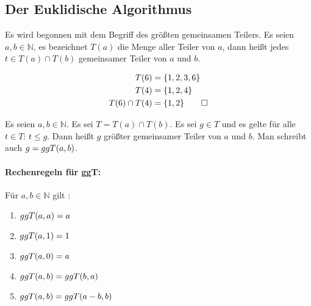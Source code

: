 \subsection{Der Euklidische Algorithmus}
Es wird begonnen mit dem Begriff des größten gemeinsamen Teilers.
Es seien $a,b \in  \mathbb{N}$, es bezeichnet $T(a)$ die Menge aller Teiler von $a$,
dann heißt jedes $t \in T(a) \cap T(b)$ gemeinsamer Teiler von $a$ und $b$.

\begin{example}
  \begin{align*}
    T(6)           & = \{1,2,3,6\}      \\
    T(4)           & = \{1,2,4\}        \\
    T(6) \cap T(4) & = \{1,2\} \qedhere
  \end{align*}
\end{example}

\begin{definition}
  Es seien $a,b \in \mathbb{N}$. Es sei $T = T(a) \cap T(b)$.
  Es sei $g \in T$ und es gelte für alle $t \in T$: $t \leq g$. Dann heißt $g$
  größter gemeinsamer Teiler von $a$ und $b$.
  Man schreibt auch $g = ggT(a,b)$.
\end{definition}

\paragraph{Rechenregeln für ggT:}
Für $a,b \in \mathbb{N}$ gilt \parencite{SITE:euklid}:
\begin{enumerate}[ref=(\arabic*)]
  \item $ggT(a,a) = a$ \label{enum:ggT1}
  \item $ggT(a,1) = 1$ \label{enum:ggT2}
  \item $ggT(a,0) = a$ \label{enum:ggT3}
  \item $ggT(a,b) = ggT(b,a)$ \label{enum:ggT4}
  \item $ggT(a,b) = ggT(a - b,b)$ \label{enum:ggT5}
\end{enumerate}

